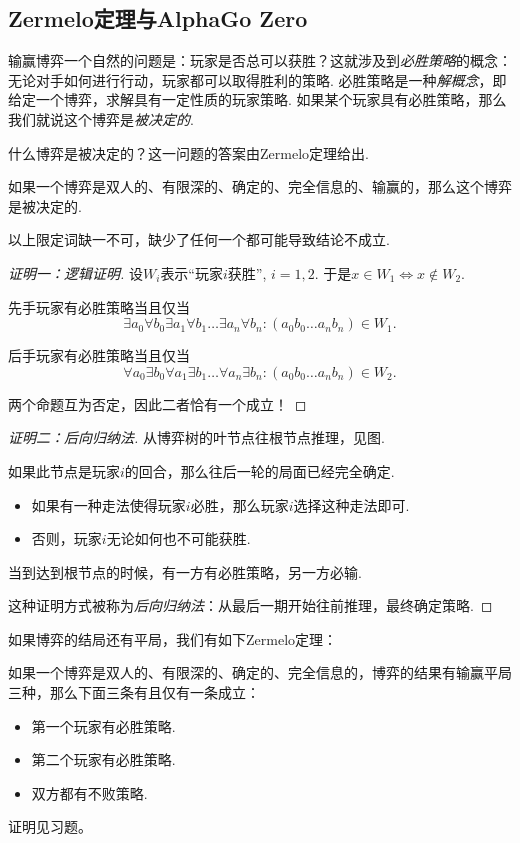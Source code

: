 \subsection{Zermelo定理与AlphaGo Zero}

输赢博弈一个自然的问题是：玩家是否总可以获胜？这就涉及到\emph{必胜策略}的概念：无论对手如何进行行动，玩家都可以取得胜利的策略. 必胜策略是一种\emph{解概念}，即给定一个博弈，求解具有一定性质的玩家策略. 如果某个玩家具有必胜策略，那么我们就说这个博弈是\emph{被决定的}. 

什么博弈是被决定的？这一问题的答案由Zermelo定理给出.

\begin{theorem}\label{thm:zermelo}
如果一个博弈是双人的、有限深的、确定的、完全信息的、输赢的，那么这个博弈是被决定的.
\end{theorem}
以上限定词缺一不可，缺少了任何一个都可能导致结论不成立.

\begin{proof}[证明一：逻辑证明]
设$W_i$表示“玩家$i$获胜”, $i=1,2$. 于是$x\in W_1\iff x\not\in W_2$.

先手玩家有必胜策略当且仅当
\[\exists a_0\forall b_0\exists a_1\forall b_1\dots\exists a_n\forall b_n: (a_0b_0\dots a_nb_n)\in W_1.\]

后手玩家有必胜策略当且仅当
\[\forall a_0\exists b_0\forall a_1\exists b_1\dots\forall a_n\exists b_n: (a_0b_0\dots a_nb_n)\in W_2.\]

两个命题互为否定，因此二者恰有一个成立！
\end{proof}

\begin{proof}[证明二：后向归纳法]
从博弈树的叶节点往根节点推理，见图.

如果此节点是玩家$i$的回合，那么往后一轮的局面已经完全确定.
\begin{itemize}
    \item 如果有一种走法使得玩家$i$必胜，那么玩家$i$选择这种走法即可.
    \item 否则，玩家$i$无论如何也不可能获胜.
\end{itemize}

当到达到根节点的时候，有一方有必胜策略，另一方必输.

这种证明方式被称为\emph{后向归纳法}：从最后一期开始往前推理，最终确定策略.
\end{proof}

如果博弈的结局还有平局，我们有如下Zermelo定理：
\begin{theorem}[有平局的Zermelo定理]\label{thm:zermelo-draw}
如果一个博弈是双人的、有限深的、确定的、完全信息的，博弈的结果有输赢平局三种，那么下面三条有且仅有一条成立：
\begin{itemize}
    \item 第一个玩家有必胜策略.
    \item 第二个玩家有必胜策略.
    \item 双方都有不败策略.
\end{itemize}
\end{theorem}
证明见习题。

